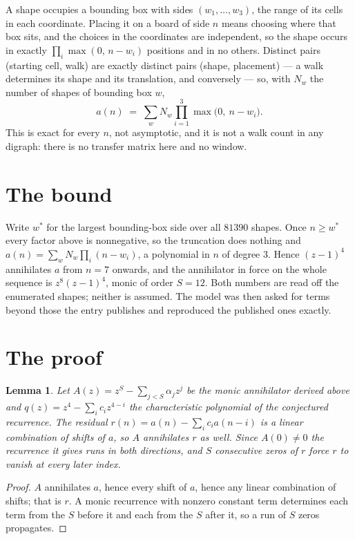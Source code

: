 \documentclass[11pt,a4paper]{article}
\theoremstyle{plain}
\newtheorem{lemma}[theorem]{Lemma}
\theoremstyle{definition}
\begin{document}
A shape occupies a bounding box with sides $(w_1,\dots,w_{3})$, the range of its cells in each
coordinate. Placing it on a board of side $n$ means choosing where that box sits, and the
choices in the coordinates are independent, so the shape occurs in exactly
$\prod_{i}\max(0,\,n-w_i)$ positions and in no others. Distinct pairs (starting cell,
walk) are exactly distinct pairs (shape, placement) --- a walk determines its shape and its
translation, and conversely --- so, with $N_w$ the number of shapes of bounding box $w$,
\[
a(n)\;=\;\sum_{w} N_w \prod_{i=1}^{3}\max\bigl(0,\ n-w_i\bigr).
\]
This is exact for every $n$, not asymptotic, and it is not a walk count in any digraph: there is
no transfer matrix here and no window.

\section{The bound}

Write $w^\ast$ for the largest bounding-box side over all $81390$ shapes. Once $n\ge w^\ast$
every factor above is nonnegative, so the truncation does nothing and
$a(n)=\sum_w N_w\prod_i(n-w_i)$, a polynomial in $n$ of degree $3$. Hence $(z-1)^{4}$
annihilates $a$ from $n=7$ onwards, and the annihilator in force on the whole sequence is
$z^{8}(z-1)^{4}$, monic of order $S=12$. Both numbers are read off the enumerated
shapes; neither is assumed. The model was then asked for terms beyond those the entry publishes
and reproduced the published ones exactly.

\section{The proof}

\begin{lemma}\label{lem:crit}
Let $A(z)=z^S-\sum_{j<S}\alpha_jz^{j}$ be the monic annihilator derived above and
$q(z)=z^{4}-\sum_ic_iz^{4-i}$ the characteristic polynomial of the conjectured
recurrence. The residual $r(n)=a(n)-\sum_ic_ia(n-i)$ is a linear combination of shifts of $a$,
so $A$ annihilates $r$ as well. Since $A(0)\ne0$ the recurrence it gives runs in both
directions, and $S$ consecutive zeros of $r$ force $r$ to vanish at every later index.
\end{lemma}

\begin{proof}
$A$ annihilates $a$, hence every shift of $a$, hence any linear combination of shifts; that is
$r$. A monic recurrence with nonzero constant term determines each term from the $S$ before it
and each from the $S$ after it, so a run of $S$ zeros propagates.
\end{proof}
\end{document}
